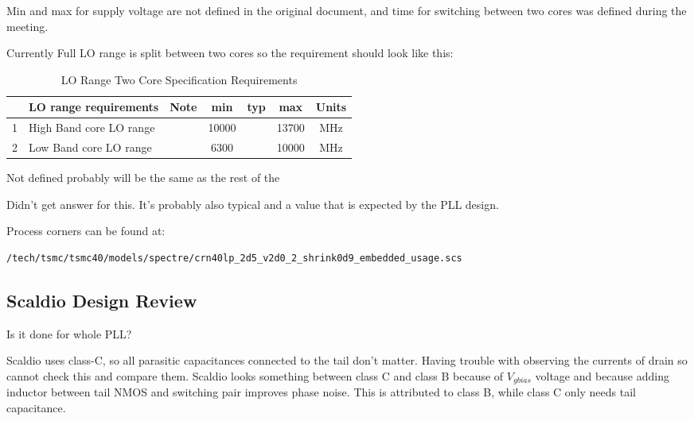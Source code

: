 \documentclass{article}
\begin{document}
Min and max for supply voltage are not defined in the original document, and time for switching between two cores was defined during the meeting.

Currently Full LO range is split between two cores so the requirement should look like this:

\begin{table}[ht]
	\centering
	\begin{tabular}{|c|l|c|c|c|c|c|}
		\hline
		& LO range requirements & Note & min & typ & max & Units \\
		\hline
		1 & High Band core LO range &  & 10000  &  & 13700 & MHz \\ 
		\hline
		2 & Low Band core LO range &  & 6300 &  & 10000 & MHz \\ 
		\hline
	\end{tabular}
	\caption{LO Range Two Core Specification Requirements} 
\end{table}

\begin{question}
	Not defined probably will be the same as the rest of the 
\end{question}


\begin{question}
	Didn't get answer for this. It's probably also typical and a value that is expected by the PLL design.
\end{question}


Process corners can be found at:

\begin{verbatim}
/tech/tsmc/tsmc40/models/spectre/crn40lp_2d5_v2d0_2_shrink0d9_embedded_usage.scs
\end{verbatim}

\subsection{Scaldio Design Review}

\begin{question}
Is it done for whole PLL?
\end{question}

\begin{question}
	Scaldio uses class-C, so all parasitic capacitances connected to the tail don't matter. Having trouble with observing the currents of drain so cannot check this and compare them. Scaldio looks something between class C and class B because of $V_{gbias}$ voltage and because adding inductor between tail NMOS and switching pair improves phase noise. This is attributed to class B, while class C only needs tail capacitance.
\end{question}
\end{document}
